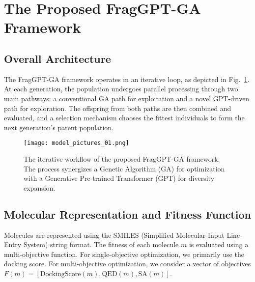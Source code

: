 \documentclass[lettersize,journal]{IEEEtran}
\begin{document}
\section{The Proposed FragGPT-GA Framework}
\subsection{Overall Architecture}
The FragGPT-GA framework operates in an iterative loop, as depicted in Fig.~\ref{fig:flowchart}. At each generation, the population undergoes parallel processing through two main pathways: a conventional GA path for exploitation and a novel GPT-driven path for exploration. The offspring from both paths are then combined and evaluated, and a selection mechanism chooses the fittest individuals to form the next generation's parent population.

\begin{figure}[!t]
\centering
\texttt{[image: model\_pictures\_01.png]}
\caption{The iterative workflow of the proposed FragGPT-GA framework. The process synergizes a Genetic Algorithm (GA) for optimization with a Generative Pre-trained Transformer (GPT) for diversity expansion.}
\label{fig:flowchart}
\end{figure}

\subsection{Molecular Representation and Fitness Function}
Molecules are represented using the SMILES (Simplified Molecular-Input Line-Entry System) string format. The fitness of each molecule $m$ is evaluated using a multi-objective function. For single-objective optimization, we primarily use the docking score. For multi-objective optimization, we consider a vector of objectives $F(m) = [\text{DockingScore}(m), \text{QED}(m), \text{SA}(m)]$.
\end{document}
